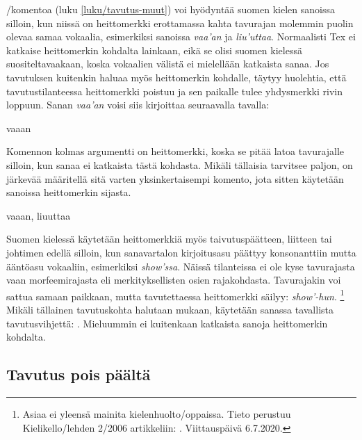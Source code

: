 \noindent
{}\-/komentoa (luku \ref{luku/tavutus-muut}) voi
hyödyntää suomen kielen sanoissa silloin, kun niissä on heittomerkki
erottamassa kahta tavurajan molemmin puolin olevaa samaa vokaalia,
esimerkiksi sanoissa \emph{vaa'an} ja \emph{liu'uttaa}. Normaalisti Tex
ei katkaise heittomerkin kohdalta lainkaan, eikä se olisi suomen
kielessä suositeltavaakaan, koska vokaalien välistä ei mielellään
katkaista sanaa. Jos tavutuksen kuitenkin haluaa myös heittomerkin
kohdalle, täytyy huolehtia, että tavutustilanteessa heittomerkki poistuu
ja sen paikalle tulee yhdysmerkki rivin loppuun. Sanan \emph{vaa'an}
voisi siis kirjoittaa seuraavalla tavalla:

\begin{koodilohkosis}
vaaan
\end{koodilohkosis}

\noindent
Komennon kolmas argumentti on heittomerkki, koska se pitää latoa
tavurajalle silloin, kun sanaa ei katkaista tästä kohdasta. Mikäli
tällaisia tarvitsee paljon, on järkevää määritellä sitä varten
yksinkertaisempi komento, jota sitten käytetään sanoissa heittomerkin
sijasta.

\begin{koodilohkosis}
\newcommand{\hm}{}
vaa\hm an, liu\hm uttaa
\end{koodilohkosis}

\noindent
Suomen kielessä käytetään heittomerkkiä myös taivutuspäätteen, liitteen
tai johtimen edellä silloin, kun sanavartalon kirjoitusasu päättyy
konsonanttiin mutta ääntöasu vokaaliin, esimerkiksi \emph{show'ssa}.
Näissä tilanteissa ei ole kyse tavurajasta vaan morfeemirajasta eli
merkityksellisten osien rajakohdasta. Tavurajakin voi sattua samaan
paikkaan, mutta tavutettaessa heittomerkki säilyy: \emph{show'-hun}.%
\footnote{Asiaa ei yleensä mainita kielenhuolto\-/oppaissa. Tieto
  perustuu Kielikello\-/lehden 2/2006 artikkeliin:
  . Viittauspäivä
  6.7.2020.} Mikäli tällainen tavutuskohta halutaan mukaan, käytetään
sanassa tavallista tavutusvihjettä: \komento{-}.
Mieluummin ei kuitenkaan katkaista sanoja heittomerkin kohdalta.

\subsection{Tavutus pois päältä}

